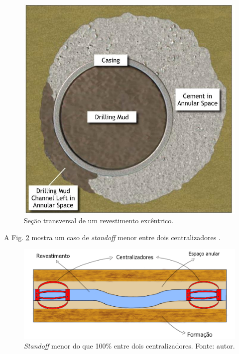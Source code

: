 \begin{figure}[H]
	\centering
	\includegraphics[scale=0.7]{img/Standoff1.png}
	\caption[Seção transversal de um revestimento excêntrico.]{Seção transversal de um revestimento excêntrico.}
	\label{fig:Standoff1}
\end{figure}
A Fig. \ref{fig:Standoff2} mostra um caso de \textit{standoff} menor entre dois centralizadores \cite{VADIM}.
\begin{figure}[H]
	\centering
	\includegraphics[width=0.7\linewidth]{img/centralizadores_standoff.png}
	\caption[\textit{Standoff} menor do que 100\% entre dois centralizadores.]{\textit{Standoff} menor do que 100\% entre dois centralizadores. Fonte: autor.}
	\label{fig:Standoff2}
\end{figure}

